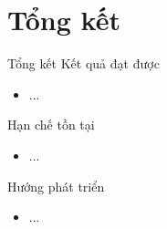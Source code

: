 \section{Tổng kết}
\begin{frame}{Tổng kết}
\putlogo
Kết quả đạt được
\begin{itemize}
	\item ...
\end{itemize}
Hạn chế tồn tại
\begin{itemize}
	\item ...
\end{itemize}
Hướng phát triển
\begin{itemize}
	\item ...
\end{itemize}
\end{frame}

